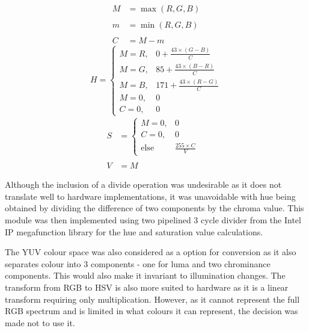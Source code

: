 \documentclass[a4paper]{article}
\begin{document}
\begin{multicols}{3}
    \noindent
    \begin{align*}
        M &= \max(R, G, B) \\ \\
        m &= \min(R, G, B) \\ \\
        C &= M-m 
    \end{align*}
    \begin{equation*}
        H = \begin{cases}
            M = R, & 0 + \frac{43 \times (G-B)}{C} \\
            M = G, & 85 + \frac{43 \times (B-R)}{C} \\
            M = B, & 171 + \frac{43 \times (R-G)}{C} \\
            M = 0, & 0 \\
            C = 0, & 0
        \end{cases} 
    \end{equation*}
    \begin{align*}
        S &= \begin{cases}
            M = 0, & 0 \\ C = 0, & 0 \\ \text{else} & \frac{255\times C}{V}
        \end{cases} & \\ \\
         V &= M  
    \end{align*}
\end{multicols}



Although the inclusion of a divide operation was undesirable as it does not 
translate well to hardware implementations, it was unavoidable with hue being 
obtained by dividing the difference of two components by the chroma value. This 
module was then implemented using two pipelined 3 cycle divider from the Intel IP
megafunction library for the hue and saturation value calculations.  

The YUV colour space was also considered as a option for conversion as it also
separates colour into 3 components - one for luma and two chrominance components.
This would also make it invariant to illumination changes. The transform from RGB
to HSV is also more suited to hardware as it is a linear transform requiring only
multiplication. However, as it cannot represent the full RGB spectrum and is 
limited in what colours it can represent, the decision was made not to use it.    
\end{document}
